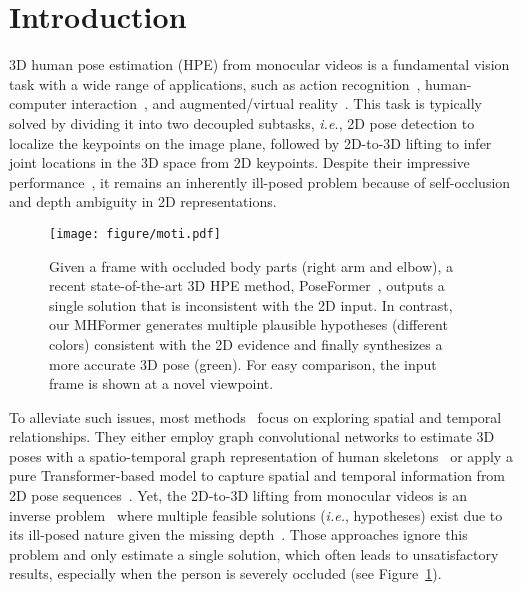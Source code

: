 \documentclass[10pt,twocolumn,letterpaper]{article}
\def\VspaceL{\vspace{-0.40cm}}
\begin{document}
\section{Introduction}
3D human pose estimation (HPE) from monocular videos is a fundamental vision task with a wide range of applications, such as action recognition~\cite{liu2017enhanced,liu2018recognizing,wang2018depth}, human-computer interaction~\cite{errity2016human}, and augmented/virtual reality~\cite{mehta2017vnect}. 
This task is typically solved by dividing it into two decoupled subtasks, \textit{i.e.}, 2D pose detection to localize the keypoints on the image plane, followed by 2D-to-3D lifting to infer joint locations in the 3D space from 2D keypoints. 
Despite their impressive performance~\cite{martinez2017simple,pavllo20193d,chen2021anatomy,gong2021poseaug}, 
it remains an inherently ill-posed problem because of self-occlusion and depth ambiguity in 2D representations. 

\begin{figure}[tb]
  \centering
  \texttt{[image: figure/moti.pdf]}
  \caption
  {Given a frame with occluded body parts (right arm and elbow), a recent state-of-the-art 3D HPE method, PoseFormer~\cite{poseformer}, outputs a single solution that is inconsistent with the 2D input. 
  In contrast, our MHFormer generates multiple plausible hypotheses (different colors) consistent with the 2D evidence and finally synthesizes a more accurate 3D pose (green). 
  For easy comparison, the input frame is shown at a novel viewpoint.}
  \label{fig:motivation}
  \VspaceL
\end{figure}

To alleviate such issues, most  methods~\cite{cai2019exploiting,wang2020motion,hu2021conditional,poseformer} focus on exploring spatial and temporal relationships. 
They either employ graph convolutional networks to estimate 3D poses with a spatio-temporal graph representation of human skeletons~\cite{cai2019exploiting,wang2020motion,hu2021conditional} or apply a pure Transformer-based model to capture spatial and temporal information from 2D pose sequences~\cite{poseformer}. 
Yet, the 2D-to-3D lifting from monocular videos is an inverse problem~\cite{bishop1994mixture} where multiple feasible solutions (\emph{i.e.}, hypotheses) exist due to its ill-posed nature given the missing depth~\cite{li2020weakly}. 
Those approaches ignore this problem and only estimate a single solution, which often leads to unsatisfactory results, especially when the person is severely occluded (see Figure~\ref{fig:motivation}). 
\end{document}

